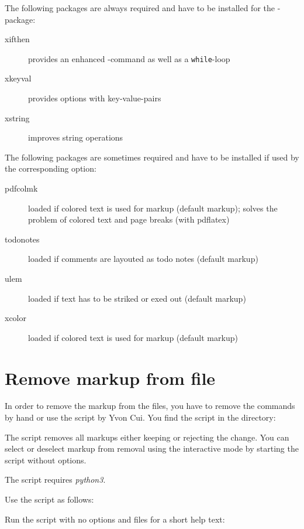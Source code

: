 The following packages are always required and have to be installed for the -package:
\begin{description}
	\item [xifthen] provides an enhanced -command as well as a \texttt{while}-loop
	\item [xkeyval] provides options with key-value-pairs
	\item [xstring] improves string operations
\end{description}

The following packages are sometimes required and have to be installed if used by the corresponding option:
\begin{description}
	\item [pdfcolmk] loaded if colored text is used for markup (default markup); solves the problem of colored text and page breaks (with pdflatex)
	\item [todonotes] loaded if comments are layouted as todo notes (default markup)
	\item [ulem] loaded if text has to be striked or exed out (default markup)
	\item [xcolor] loaded if colored text is used for markup (default markup)
\end{description}


\cleardoublepage
\section{Remove markup from file}
\label{sec:remove-markup}

In order to remove the markup from the  files, you have to remove the commands by hand or use the script by Yvon Cui.
You find the script in the directory:


The script removes all markups either keeping or rejecting the change.
You can select or deselect markup from removal using the interactive mode by starting the script without options.

The script requires \emph{python3}.

Use the script as follows:


Run the script with no options and files for a short help text:


